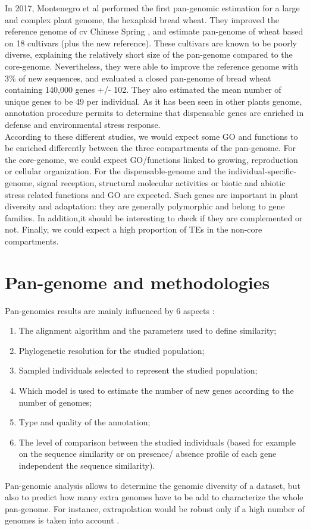 \documentclass[a4paper,10pt,twoside]{report}
\begin{document}
In 2017, Montenegro et al \cite{Montenegro2017} performed the first pan-genomic estimation for a large and complex plant genome, the hexaploid bread wheat. They improved the reference genome of cv Chinese Spring \cite{Mayer2014}, and estimate pan-genome of wheat based on 18 cultivars (plus the new reference). These cultivars are known to be poorly diverse, explaining the relatively short size of the pan-genome compared to the core-genome. Nevertheless, they were able to improve the reference genome with 3\% of new sequences, and evaluated a closed pan-genome of bread wheat containing 140,000 genes +/- 102. They also estimated the mean number of unique genes to be 49 per individual. As it has been seen in other plants genome, annotation procedure permits to determine that dispensable genes are enriched in defense and environmental stress response.\\

According to these different studies, we would expect some GO and functions to be enriched differently between the three compartments of the pan-genome. For the core-genome, we could expect GO/functions linked to growing, reproduction or cellular organization. For the dispensable-genome and the individual-specific-genome, signal reception, structural molecular activities or biotic and abiotic stress related functions and GO are expected. Such genes are important in plant diversity and adaptation: they are generally polymorphic and belong to gene families. In addition,it should be interesting to check if they are complemented or not. Finally, we could expect a high proportion of TEs in the non-core compartments.

\section{Pan-genome and methodologies}
Pan-genomics results are mainly influenced by 6 aspects \cite{Vernikos2015}:
\begin{enumerate}
\item The alignment algorithm and the parameters used to define similarity;
\item Phylogenetic resolution for the studied population;
\item Sampled individuals selected to represent the studied population;
\item Which model is used to estimate the number of new genes according to the number of genomes;
\item Type and quality of the annotation;
\item The level of comparison between the studied individuals (based for example on the sequence similarity or on presence/ absence profile of each gene independent the sequence similarity).
\end{enumerate}
Pan-genomic analysis allows to determine the genomic diversity of a dataset, but also to predict how many extra genomes have to be add to characterize the whole pan-genome. For instance, extrapolation would be robust only if a high number of genomes is taken into account \cite{Vernikos2015}.\\
\end{document}
